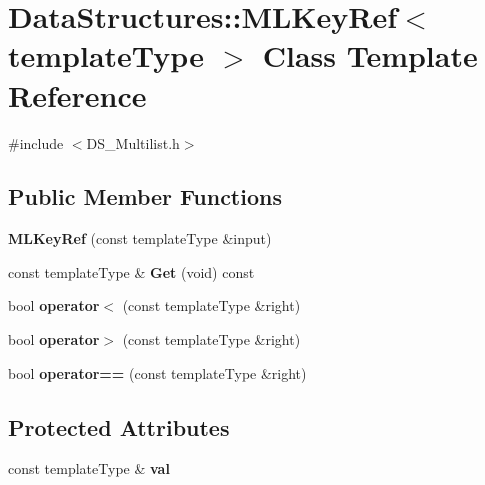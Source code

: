 \hypertarget{class_data_structures_1_1_m_l_key_ref}{\section{Data\-Structures\-:\-:M\-L\-Key\-Ref$<$ template\-Type $>$ Class Template Reference}
\label{class_data_structures_1_1_m_l_key_ref}
}


{\ttfamily \#include $<$D\-S\-\_\-\-Multilist.\-h$>$}

\subsection*{Public Member Functions}
\begin{DoxyCompactItemize}
\item 
\hypertarget{class_data_structures_1_1_m_l_key_ref_ac33da54b570bf58a80e8cc0302bc3ff7}{{\bfseries M\-L\-Key\-Ref} (const template\-Type \&input)}\label{class_data_structures_1_1_m_l_key_ref_ac33da54b570bf58a80e8cc0302bc3ff7}

\item 
\hypertarget{class_data_structures_1_1_m_l_key_ref_ab9303a401a7ba2b676d7a4c7a04d3a1b}{const template\-Type \& {\bfseries Get} (void) const }\label{class_data_structures_1_1_m_l_key_ref_ab9303a401a7ba2b676d7a4c7a04d3a1b}

\item 
\hypertarget{class_data_structures_1_1_m_l_key_ref_a73ea009ca6f28a2ee6b6ecedd6037c96}{bool {\bfseries operator$<$} (const template\-Type \&right)}\label{class_data_structures_1_1_m_l_key_ref_a73ea009ca6f28a2ee6b6ecedd6037c96}

\item 
\hypertarget{class_data_structures_1_1_m_l_key_ref_afa1fbcd3a6ef37fef6c2272375e3ac1f}{bool {\bfseries operator$>$} (const template\-Type \&right)}\label{class_data_structures_1_1_m_l_key_ref_afa1fbcd3a6ef37fef6c2272375e3ac1f}

\item 
\hypertarget{class_data_structures_1_1_m_l_key_ref_a43600e005a8dddbbb54608963f44bdfd}{bool {\bfseries operator==} (const template\-Type \&right)}\label{class_data_structures_1_1_m_l_key_ref_a43600e005a8dddbbb54608963f44bdfd}

\end{DoxyCompactItemize}
\subsection*{Protected Attributes}
\begin{DoxyCompactItemize}
\item 
\hypertarget{class_data_structures_1_1_m_l_key_ref_a07b37fbb3752adc4db2109e225201688}{const template\-Type \& {\bfseries val}}\label{class_data_structures_1_1_m_l_key_ref_a07b37fbb3752adc4db2109e225201688}

\end{DoxyCompactItemize}


